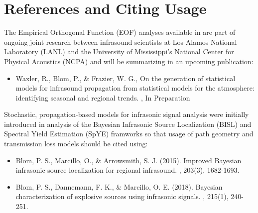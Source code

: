 \documentclass[letterpaper,10pt,english]{sphinxmanual}
\begin{document}
\section{References and Citing Usage}
\label{\detokenize{references:references-and-citing-usage}}\label{\detokenize{references:references}}\label{\detokenize{references::doc}}
The Empirical Orthogonal Function (EOF) analyses available in  are part of ongoing joint research between infrasound scientists at Los Alamos National Laboratory (LANL) and the University of Mississippi’s National Center for Physical Acoustics (NCPA) and will be summarizing in an upcoming publication:
\begin{itemize}
\item {} 
Waxler, R., Blom, P., \& Frazier, W. G., On the generation of statistical models for infrasound propagation from statistical models for the atmosphere: identifying seasonal and regional trends.  , In Preparation

\end{itemize}

Stochastic, propagation-based models for infrasonic signal analysis were initially introduced in analysis of the Bayesian Infrasonic Source Localization (BISL) and Spectral Yield Estimation (SpYE) framworks so that usage of path geometry and transmission loss models should be cited using:
\begin{itemize}
\item {} 
Blom, P. S., Marcillo, O., \& Arrowsmith, S. J. (2015). Improved Bayesian infrasonic source localization for regional infrasound. , 203(3), 1682-1693.

\item {} 
Blom, P. S., Dannemann, F. K., \& Marcillo, O. E. (2018). Bayesian characterization of explosive sources using infrasonic signals. , 215(1), 240-251.

\end{itemize}
\end{document}
